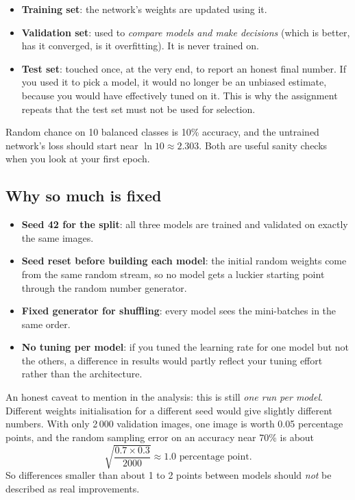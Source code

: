 \documentclass[11pt]{article}
\newcommand{\key}[1]{\textbf{#1}}
\begin{document}
\begin{itemize}[noitemsep]
\item \key{Training set}: the network's weights are updated using it.
\item \key{Validation set}: used to \emph{compare models and make decisions} (which is better, has it converged, is it overfitting). It is never trained on.
\item \key{Test set}: touched once, at the very end, to report an honest final number. If you used it to pick a model, it would no longer be an unbiased estimate, because you would have effectively tuned on it. This is why the assignment repeats that the test set must not be used for selection.
\end{itemize}

Random chance on 10 balanced classes is 10\% accuracy, and the untrained network's loss should start near $\ln 10 \approx 2.303$. Both are useful sanity checks when you look at your first epoch.

\subsection{Why so much is fixed}

\begin{itemize}[noitemsep]
\item \key{Seed 42 for the split}: all three models are trained and validated on exactly the same images.
\item \key{Seed reset before building each model}: the initial random weights come from the same random stream, so no model gets a luckier starting point through the random number generator.
\item \key{Fixed generator for shuffling}: every model sees the mini-batches in the same order.
\item \key{No tuning per model}: if you tuned the learning rate for one model but not the others, a difference in results would partly reflect your tuning effort rather than the architecture.
\end{itemize}

An honest caveat to mention in the analysis: this is still \emph{one run per model}. Different weights initialisation for a different seed would give slightly different numbers. With only 2\,000 validation images, one image is worth 0.05 percentage points, and the random sampling error on an accuracy near 70\% is about
\[
\sqrt{\frac{0.7\times 0.3}{2000}} \approx 1.0 \text{ percentage point.}
\]
So differences smaller than about 1 to 2 points between models should \emph{not} be described as real improvements.
\end{document}
